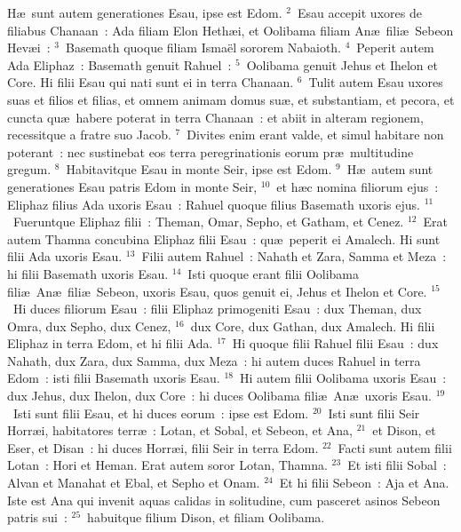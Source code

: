 \lettrine[lines=3,image=true,loversize=0.05,lraise=-0.03]{H}{}\ae\ sunt autem generationes Esau, ipse est Edom.
${}^{2}$~Esau accepit uxores de filiabus Chanaan~: Ada filiam Elon Heth\ae i, et Oolibama filiam An\ae\ fili\ae\ Sebeon Hev\ae i~:
${}^{3}$~Basemath quoque filiam Isma\"el sororem Nabaioth.
${}^{4}$~Peperit autem Ada Eliphaz~: Basemath genuit Rahuel~:
${}^{5}$~Oolibama genuit Jehus et Ihelon et Core. Hi filii Esau qui nati sunt ei in terra Chanaan.
${}^{6}$~Tulit autem Esau uxores suas et filios et filias, et omnem animam domus su\ae , et substantiam, et pecora, et cuncta qu\ae\ habere poterat in terra Chanaan~: et abiit in alteram regionem, recessitque a fratre suo Jacob.
${}^{7}$~Divites enim erant valde, et simul habitare non poterant~: nec sustinebat eos terra peregrinationis eorum pr\ae\ multitudine gregum.
${}^{8}$~Habitavitque Esau in monte Seir, ipse est Edom.
${}^{9}$~H\ae\ autem sunt generationes Esau patris Edom in monte Seir,
${}^{10}$~et h\ae c nomina filiorum ejus~: Eliphaz filius Ada uxoris Esau~: Rahuel quoque filius Basemath uxoris ejus.
${}^{11}$~Fueruntque Eliphaz filii~: Theman, Omar, Sepho, et Gatham, et Cenez.
${}^{12}$~Erat autem Thamna concubina Eliphaz filii Esau~: qu\ae\ peperit ei Amalech. Hi sunt filii Ada uxoris Esau.
${}^{13}$~Filii autem Rahuel~: Nahath et Zara, Samma et Meza~: hi filii Basemath uxoris Esau.
${}^{14}$~Isti quoque erant filii Oolibama fili\ae\ An\ae\ fili\ae\ Sebeon, uxoris Esau, quos genuit ei, Jehus et Ihelon et Core.
${}^{15}$~Hi duces filiorum Esau~: filii Eliphaz primogeniti Esau~: dux Theman, dux Omra, dux Sepho, dux Cenez,
${}^{16}$~dux Core, dux Gathan, dux Amalech. Hi filii Eliphaz in terra Edom, et hi filii Ada.
${}^{17}$~Hi quoque filii Rahuel filii Esau~: dux Nahath, dux Zara, dux Samma, dux Meza~: hi autem duces Rahuel in terra Edom~: isti filii Basemath uxoris Esau.
${}^{18}$~Hi autem filii Oolibama uxoris Esau~: dux Jehus, dux Ihelon, dux Core~: hi duces Oolibama fili\ae\ An\ae\ uxoris Esau.
${}^{19}$~Isti sunt filii Esau, et hi duces eorum~: ipse est Edom.
${}^{20}$~Isti sunt filii Seir Horr\ae i, habitatores terr\ae~: Lotan, et Sobal, et Sebeon, et Ana,
${}^{21}$~et Dison, et Eser, et Disan~: hi duces Horr\ae i, filii Seir in terra Edom.
${}^{22}$~Facti sunt autem filii Lotan~: Hori et Heman. Erat autem soror Lotan, Thamna.
${}^{23}$~Et isti filii Sobal~: Alvan et Manahat et Ebal, et Sepho et Onam.
${}^{24}$~Et hi filii Sebeon~: Aja et Ana. Iste est Ana qui invenit aquas calidas in solitudine, cum pasceret asinos Sebeon patris sui~:
${}^{25}$~habuitque filium Dison, et filiam Oolibama.
